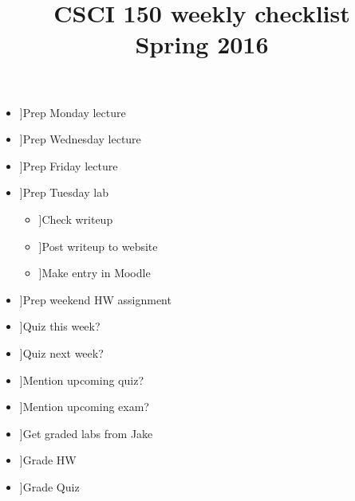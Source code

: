 \documentclass{article}
\title{CSCI 150 weekly checklist \\ {\small Spring 2016}}
\date{}
\newcommand{\cbox}{\framebox[1em]{\phantom{x}}}
\newcommand{\ci}{\item[\cbox]}
\begin{document}
\maketitle
\thispagestyle{empty}

\begin{itemize}
\ci Prep Monday lecture
\ci Prep Wednesday lecture
\ci Prep Friday lecture \\

\ci Prep Tuesday lab
\begin{itemize}
\ci Check writeup
\ci Post writeup to website
\ci Make entry in Moodle
\end{itemize}
\ci Prep weekend HW assignment \\

\ci Quiz this week?
\ci Quiz next week?
\ci Mention upcoming quiz?
\ci Mention upcoming exam? \\

\ci Get graded labs from Jake
\ci Grade HW
\ci Grade Quiz
\end{itemize}
\end{document}
